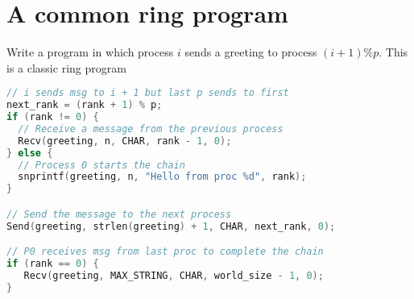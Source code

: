 \section*{A common ring program}
Write a program in which process $i$ sends a greeting to process $(i+1)\%p$.  This is a classic ring program
\begin{lstlisting}[language=c]
// i sends msg to i + 1 but last p sends to first
next_rank = (rank + 1) % p;
if (rank != 0) {
  // Receive a message from the previous process
  Recv(greeting, n, CHAR, rank - 1, 0);
} else {
  // Process 0 starts the chain
  snprintf(greeting, n, "Hello from proc %d", rank);
}

// Send the message to the next process
Send(greeting, strlen(greeting) + 1, CHAR, next_rank, 0);

// P0 receives msg from last proc to complete the chain
if (rank == 0) {
   Recv(greeting, MAX_STRING, CHAR, world_size - 1, 0);
}
\end{lstlisting}
